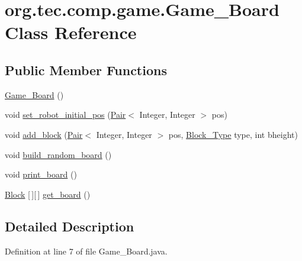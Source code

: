 \hypertarget{classorg_1_1tec_1_1comp_1_1game_1_1_game___board}{}\section{org.\+tec.\+comp.\+game.\+Game\+\_\+\+Board Class Reference}
\label{classorg_1_1tec_1_1comp_1_1game_1_1_game___board}
\subsection*{Public Member Functions}
\begin{DoxyCompactItemize}
\item 
\mbox{\hyperlink{classorg_1_1tec_1_1comp_1_1game_1_1_game___board_a020c6937bd8cc42e861c3934bc95f405}{Game\+\_\+\+Board}} ()
\item 
void \mbox{\hyperlink{classorg_1_1tec_1_1comp_1_1game_1_1_game___board_af7dadc1a7038ba5d162594d72493be73}{set\+\_\+robot\+\_\+initial\+\_\+pos}} (\mbox{\hyperlink{classorg_1_1tec_1_1comp_1_1interpreter_1_1_pair}{Pair}}$<$ Integer, Integer $>$ pos)
\item 
void \mbox{\hyperlink{classorg_1_1tec_1_1comp_1_1game_1_1_game___board_af6da7bb5c87ddbdffdaa92803dd5a1de}{add\+\_\+block}} (\mbox{\hyperlink{classorg_1_1tec_1_1comp_1_1interpreter_1_1_pair}{Pair}}$<$ Integer, Integer $>$ pos, \mbox{\hyperlink{enumorg_1_1tec_1_1comp_1_1game_1_1_block___type}{Block\+\_\+\+Type}} type, int bheight)
\item 
void \mbox{\hyperlink{classorg_1_1tec_1_1comp_1_1game_1_1_game___board_a6bafcf63001af5e8ffa1310c0be20134}{build\+\_\+random\+\_\+board}} ()
\item 
void \mbox{\hyperlink{classorg_1_1tec_1_1comp_1_1game_1_1_game___board_a175457969c10e2d378dac5593094167a}{print\+\_\+board}} ()
\item 
\mbox{\hyperlink{classorg_1_1tec_1_1comp_1_1game_1_1_block}{Block}} \mbox{[}$\,$\mbox{]}\mbox{[}$\,$\mbox{]} \mbox{\hyperlink{classorg_1_1tec_1_1comp_1_1game_1_1_game___board_a28da1a92b376677d61a0cc9b99ae6f2c}{get\+\_\+board}} ()
\end{DoxyCompactItemize}


\subsection{Detailed Description}


Definition at line 7 of file Game\+\_\+\+Board.\+java.



